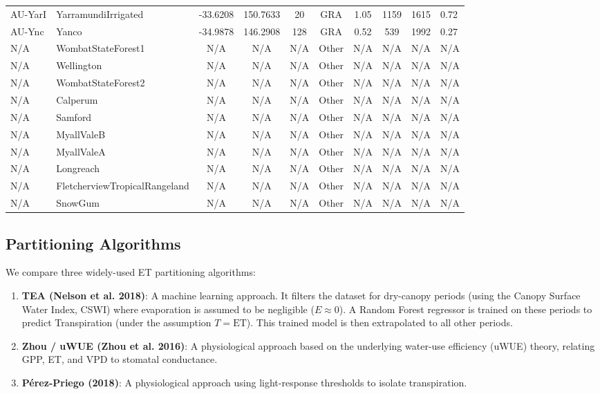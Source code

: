 \documentclass[11pt,a4paper]{article}
\begin{document}
\begin{longtable}{llccccccc}
AU-YarI & YarramundiIrrigated & -33.6208 & 150.7633 & 20 & GRA & 1.05 & 1159 & 1615 & 0.72 \\
AU-Ync & Yanco & -34.9878 & 146.2908 & 128 & GRA & 0.52 & 539 & 1992 & 0.27 \\
N/A & WombatStateForest1 & N/A & N/A & N/A & Other & N/A & N/A & N/A & N/A \\
N/A & Wellington & N/A & N/A & N/A & Other & N/A & N/A & N/A & N/A \\
N/A & WombatStateForest2 & N/A & N/A & N/A & Other & N/A & N/A & N/A & N/A \\
N/A & Calperum & N/A & N/A & N/A & Other & N/A & N/A & N/A & N/A \\
N/A & Samford & N/A & N/A & N/A & Other & N/A & N/A & N/A & N/A \\
N/A & MyallValeB & N/A & N/A & N/A & Other & N/A & N/A & N/A & N/A \\
N/A & MyallValeA & N/A & N/A & N/A & Other & N/A & N/A & N/A & N/A \\
N/A & Longreach & N/A & N/A & N/A & Other & N/A & N/A & N/A & N/A \\
N/A & FletcherviewTropicalRangeland & N/A & N/A & N/A & Other & N/A & N/A & N/A & N/A \\
N/A & SnowGum & N/A & N/A & N/A & Other & N/A & N/A & N/A & N/A \\
\bottomrule
\end{longtable}

\subsection{Partitioning Algorithms}
We compare three widely-used ET partitioning algorithms:
\begin{enumerate}
    \item \textbf{TEA (Nelson et al. 2018)}: A machine learning approach. It filters the dataset for dry-canopy periods (using the Canopy Surface Water Index, CSWI) where evaporation is assumed to be negligible ($E \approx 0$). A Random Forest regressor is trained on these periods to predict Transpiration (under the assumption $T = \text{ET}$). This trained model is then extrapolated to all other periods.
    \item \textbf{Zhou / uWUE (Zhou et al. 2016)}: A physiological approach based on the underlying water-use efficiency (uWUE) theory, relating GPP, ET, and VPD to stomatal conductance.
    \item \textbf{P\'erez-Priego (2018)}: A physiological approach using light-response thresholds to isolate transpiration.
\end{enumerate}
\end{document}
